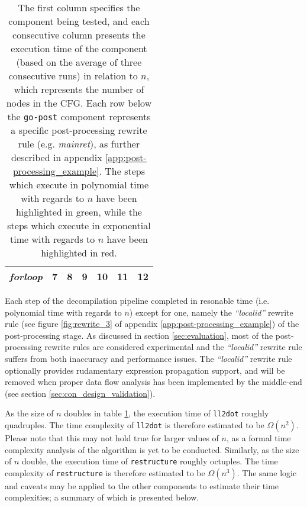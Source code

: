 \begin{table}[htbp]
\begin{center}
\begin{tabular}{|l|l|l|l|l|l|l|}
			\rowcolor{light_green_3}
			\textit{forloop} & 7 & 8 & 9 & 10 & 11 & 12 \\
			\hline
		\end{tabular}
	\end{center}
	\caption{The first column specifies the component being tested, and each consecutive column presents the execution time of the component (based on the average of three consecutive runs) in relation to $ n $, which represents the number of nodes in the CFG. Each row below the \texttt{go-post} component represents a specific post-processing rewrite rule (e.g. \textit{mainret}), as further described in appendix \ref{app:post-processing_example}. The steps which execute in polynomial time with regards to $ n $ have been highlighted in green, while the steps which execute in exponential time with regards to $ n $ have been highlighted in red.}
	\label{tbl:run_time_summary}
\end{table}

Each step of the decompilation pipeline completed in resonable time (i.e. polynomial time with regards to $ n $) except for one, namely the \textit{``localid''} rewrite rule (see figure \ref{fig:rewrite_3} of appendix \ref{app:post-processing_example}) of the post-processing stage. As discussed in section \ref{sec:evaluation}, most of the post-processing rewrite rules are considered experimental and the \textit{``localid''} rewrite rule suffers from both inaccuracy and performance issues. The \textit{``localid''} rewrite rule optionally provides rudamentary expression propagation support, and will be removed when proper data flow analysis has been implemented by the middle-end (see section \ref{sec:con_design_validation}).

As the size of $ n $ doubles in table \ref{tbl:run_time_summary}, the execution time of \texttt{ll2dot} roughly quadruples. The time complexity of \texttt{ll2dot} is therefore estimated to be $ \Omega(n^{2}) $. Please note that this may not hold true for larger values of $ n $, as a formal time complexity analysis of the algorithm is yet to be conducted. Similarly, as the size of $ n $ double, the execution time of \texttt{restructure} roughly octuples. The time complexity of \texttt{restructure} is therefore estimated to be $ \Omega(n^{3}) $. The same logic and caveats may be applied to the other components to estimate their time complexities; a summary of which is presented below.


